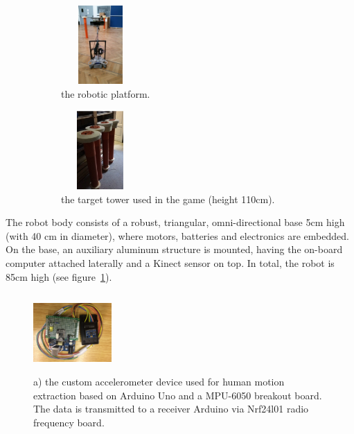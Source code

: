 \begin{figure}[thpb]
    \centering
    \begin{subfigure}[b]{0.3\textwidth}
        \includegraphics[width=3cm,height=3cm]{images/04-activity/mobilerobot.jpeg}
        \caption{the robotic platform.}
    \end{subfigure}
    \begin{subfigure}[b]{0.3\textwidth}
        \includegraphics[width=3cm,height=3cm]{images/04-activity/tubes.jpg}
        \caption{the target tower used in the game (height 110cm).}
    \end{subfigure}
    \caption{}
    \label{fig:robot_tubes}
\end{figure}

The robot body consists of a robust, triangular, omni-directional base 5cm high (with 40 cm in diameter), where motors, batteries and electronics are embedded. On the base, an auxiliary aluminum structure is mounted, having the on-board computer attached laterally and a Kinect sensor on top. In total, the robot is 85cm high (see figure~\ref{fig:robot_tubes}).

\begin{figure}[thpb]
      \centering
      \includegraphics[width=3cm,height=3cm]{images/04-activity/sender.jpg}
      \caption{a) the custom accelerometer device used for human motion extraction based on Arduino Uno and a MPU-6050 breakout board. The data is transmitted to a receiver Arduino via Nrf24l01 radio frequency board.}\label{the_accelerometer}
\end{figure}

